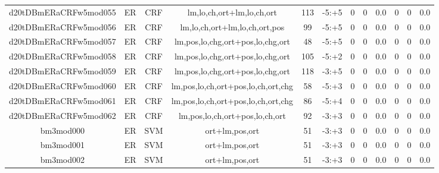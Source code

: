 \documentclass[a4paper]{article}
\begin{document}
\begin{landscape}
\begin{center}
\begin{tabular}{ |c|c|c|c|c|c|c|c|c|c|c|c|}
 
 	
 	\small{ d20tDBmERaCRFw5mod055 } & ER & CRF & lm,lo,ch,ort+lm,lo,ch,ort  &  113 &  -5:+5  &  0 & 0 & 0.0  &  0 & 0 & 0.0 \\
 	

 
 	
 	\small{ d20tDBmERaCRFw5mod056 } & ER & CRF & lm,lo,ch,ort+lm,lo,ch,ort,pos  &  99 &  -5:+5  &  0 & 0 & 0.0  &  0 & 0 & 0.0 \\
 	

 
 	
 	\small{ d20tDBmERaCRFw5mod057 } & ER & CRF & lm,pos,lo,chg,ort+pos,lo,chg,ort  &  48 &  -5:+5  &  0 & 0 & 0.0  &  0 & 0 & 0.0 \\
 	

 
 	
 	\small{ d20tDBmERaCRFw5mod058 } & ER & CRF & lm,pos,lo,chg,ort+pos,lo,chg,ort  &  105 &  -5:+2  &  0 & 0 & 0.0  &  0 & 0 & 0.0 \\
 	

 
 	
 	\small{ d20tDBmERaCRFw5mod059 } & ER & CRF & lm,pos,lo,chg,ort+pos,lo,chg,ort  &  118 &  -3:+5  &  0 & 0 & 0.0  &  0 & 0 & 0.0 \\
 	

 
 	
 	\small{ d20tDBmERaCRFw5mod060 } & ER & CRF & lm,pos,lo,ch,ort+pos,lo,ch,ort,chg  &  58 &  -5:+3  &  0 & 0 & 0.0  &  0 & 0 & 0.0 \\
 	

 
 	
 	\small{ d20tDBmERaCRFw5mod061 } & ER & CRF & lm,pos,lo,ch,ort+pos,lo,ch,ort,chg  &  86 &  -5:+4  &  0 & 0 & 0.0  &  0 & 0 & 0.0 \\
 	

 
 	
 	\small{ d20tDBmERaCRFw5mod062 } & ER & CRF & lm,pos,lo,ch,ort+pos,lo,ch,ort  &  92 &  -3:+3  &  0 & 0 & 0.0  &  0 & 0 & 0.0 \\
 	

 
 	
 	\small{ bm3mod000 } & ER & SVM & ort+lm,pos,ort  &  51 &  -3:+3  &  0 & 0 & 0.0  &  0 & 0 & 0.0 \\
 	

 
 	
 	\small{ bm3mod001 } & ER & SVM & ort+lm,pos,ort  &  51 &  -3:+3  &  0 & 0 & 0.0  &  0 & 0 & 0.0 \\
 	

 
 	
 	\small{ bm3mod002 } & ER & SVM & ort+lm,pos,ort  &  51 &  -3:+3  &  0 & 0 & 0.0  &  0 & 0 & 0.0 \\
 	


\end{tabular}
\end{center}
\end{landscape}
\end{document}

